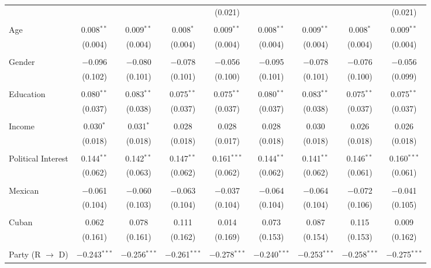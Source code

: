 \begin{table}[!htbp]
\begin{tabular}{@{\extracolsep{5pt}}lcccccccc}
  &  &  &  & (0.021) &  &  &  & (0.021) \\ 
  & & & & & & & & \\ 
 Age & 0.008$^{**}$ & 0.009$^{**}$ & 0.008$^{*}$ & 0.009$^{**}$ & 0.008$^{**}$ & 0.009$^{**}$ & 0.008$^{*}$ & 0.009$^{**}$ \\ 
  & (0.004) & (0.004) & (0.004) & (0.004) & (0.004) & (0.004) & (0.004) & (0.004) \\ 
  & & & & & & & & \\ 
 Gender & $-$0.096 & $-$0.080 & $-$0.078 & $-$0.056 & $-$0.095 & $-$0.078 & $-$0.076 & $-$0.056 \\ 
  & (0.102) & (0.101) & (0.101) & (0.100) & (0.101) & (0.101) & (0.100) & (0.099) \\ 
  & & & & & & & & \\ 
 Education & 0.080$^{**}$ & 0.083$^{**}$ & 0.075$^{**}$ & 0.075$^{**}$ & 0.080$^{**}$ & 0.083$^{**}$ & 0.075$^{**}$ & 0.075$^{**}$ \\ 
  & (0.037) & (0.038) & (0.037) & (0.037) & (0.037) & (0.038) & (0.037) & (0.037) \\ 
  & & & & & & & & \\ 
 Income & 0.030$^{*}$ & 0.031$^{*}$ & 0.028 & 0.028 & 0.028 & 0.030 & 0.026 & 0.026 \\ 
  & (0.018) & (0.018) & (0.018) & (0.017) & (0.018) & (0.018) & (0.018) & (0.018) \\ 
  & & & & & & & & \\ 
 Political Interest & 0.144$^{**}$ & 0.142$^{**}$ & 0.147$^{**}$ & 0.161$^{***}$ & 0.144$^{**}$ & 0.141$^{**}$ & 0.146$^{**}$ & 0.160$^{***}$ \\ 
  & (0.062) & (0.063) & (0.062) & (0.062) & (0.062) & (0.062) & (0.061) & (0.061) \\ 
  & & & & & & & & \\ 
 Mexican & $-$0.061 & $-$0.060 & $-$0.063 & $-$0.037 & $-$0.064 & $-$0.064 & $-$0.072 & $-$0.041 \\ 
  & (0.104) & (0.103) & (0.104) & (0.104) & (0.104) & (0.104) & (0.106) & (0.105) \\ 
  & & & & & & & & \\ 
 Cuban & 0.062 & 0.078 & 0.111 & 0.014 & 0.073 & 0.087 & 0.115 & 0.009 \\ 
  & (0.161) & (0.161) & (0.162) & (0.169) & (0.153) & (0.154) & (0.153) & (0.162) \\ 
  & & & & & & & & \\ 
 Party (R $\longrightarrow$ D) & $-$0.243$^{***}$ & $-$0.256$^{***}$ & $-$0.261$^{***}$ & $-$0.278$^{***}$ & $-$0.240$^{***}$ & $-$0.253$^{***}$ & $-$0.258$^{***}$ & $-$0.275$^{***}$ \\ 

\end{tabular}
\end{table}
